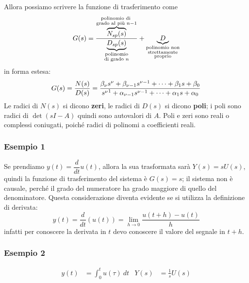 \documentclass{article}
\numberwithin{equation}{subsection}
\begin{document}
Allora possiamo scrivere la funzione di trasferimento come
\begin{equation}
    G(s) = \frac{\overbrace{N_{sp}(s)}^{\substack{\text{polinomio di } \\ \text{grado al più } n-1}}}{\underbrace{D_{sp}(s)}_{\substack{\text{polinomio} \\ \text{di grado } n}}} 
    + \underbrace{D}_{\substack{\text{polinomio non} \\ \text{strettamente} \\ \text{proprio}}}
\end{equation}
in forma estesa:
\begin{equation}
    G(s) = \frac{N(s)}{D(s)} = \frac{\beta_{\nu}s^{\nu} + \beta_{\nu-1}s^{\nu-1} + \cdots + \beta_1s + \beta_0}{s^{\nu}\footnotemark + \alpha_{\nu-1}s^{\nu-1} + \cdots + \alpha_1s + \alpha_0}
\end{equation}
Le radici di $N(s)$ si dicono \textbf{zeri}, le radici di $D(s)$ si dicono \textbf{poli}; i poli sono radici di $\det(sI-A)$ quindi sono autovalori di $A$. Poli e zeri sono reali o complessi coniugati, poiché radici di polinomi a coefficienti reali.

\subsubsection*{Esempio 1}
Se prendiamo $y(t) = \dfrac{d}{dt} u(t)$, allora la sua trasformata sarà $Y(s)=s U(s)$, quindi la funzione di trasferimento del sistema è $G(s)=s$; il sistema non è causale, perché il grado del numeratore ha grado maggiore di quello del denominatore. Questa considerazione diventa evidente se si utilizza la definizione di derivata:
\[
    y(t) = \frac{d}{dt}(u(t)) = \lim_{h\rightarrow 0} \frac{u(t+h)-u(t)}{h}
\]
infatti per conoscere la derivata in $t$ devo conoscere il valore del segnale in $t+h$.

\subsubsection*{Esempio 2}
\begin{align*}
    y(t) &= \int_{0}^t u(\tau) \ dt & Y(s) &= \frac{1}{s}U(s)
\end{align*}
\end{document}
